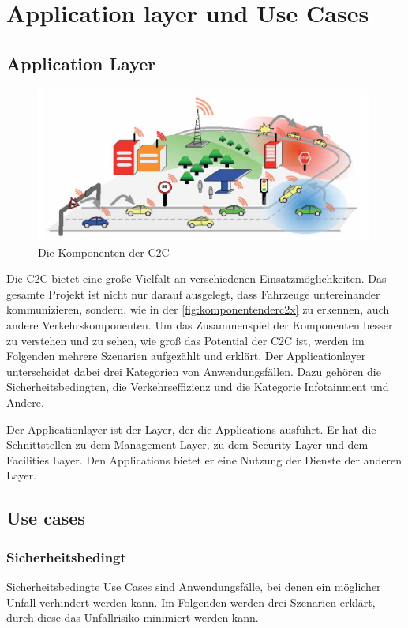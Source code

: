 \chapter{Application layer und Use Cases\label{chap:usecases}}
\section{Application Layer \label{sec:applicationLayer}}
\begin{figure}[htbp]
\includegraphics[width=0.99\textwidth]{content/images/06_use_cases/komponenten.png}
\caption{Die Komponenten der \acl{C2C} \cite{etsi102638}}
\label{fig:komponentenderc2x}
\end{figure}
Die \acl{C2C} bietet eine große Vielfalt an verschiedenen Ein\-satz\-mög\-lich\-keit\-en. Das gesamte Projekt ist nicht nur darauf ausgelegt, dass Fahrzeuge untereinander kommunizieren, sondern, wie in der \autoref{fig:komponentenderc2x} zu erkennen, auch andere Verkehrskomponenten. Um das Zusammenspiel der Komponenten besser zu verstehen und zu sehen, wie groß das Potential der \acl{C2C} ist, werden im Folgenden mehrere Szenarien aufgezählt und erklärt. Der Applicationlayer unterscheidet dabei drei Kategorien von Anwendungsfällen. Dazu gehören die Sicherheitsbedingten, die Verkehrseffizienz und die Kategorie Infotainment und Andere.

Der Applicationlayer ist der Layer, der die Applications ausführt. Er hat die Schnittstellen zu dem Management Layer, zu dem Security Layer und dem Facilities Layer. Den Applications bietet er eine Nutzung der Dienste der anderen Layer. 

\section{Use cases}
\subsection{Sicherheitsbedingt}
Sicherheitsbedingte Use Cases sind Anwendungsfälle, bei denen ein möglicher Unfall verhindert werden kann. Im Folgenden werden drei Szenarien erklärt, durch diese das Unfallrisiko minimiert werden kann.


